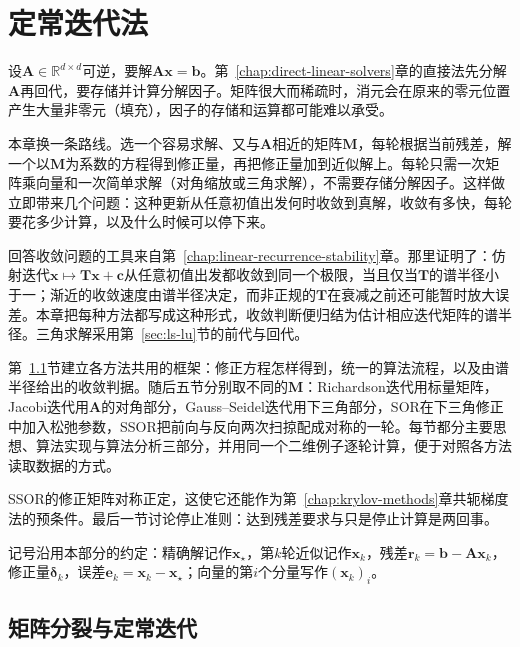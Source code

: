 \chapter{定常迭代法}
\label{sec:ls-stationary-iterations}
\label{chap:stationary-iterations}

设$\bm A\in\mathbb R^{d\times d}$可逆，要解$\bm A\bm x=\bm b$。第~\ref{chap:direct-linear-solvers}章的直接法先分解$\bm A$再回代，要存储并计算分解因子。矩阵很大而稀疏时，消元会在原来的零元位置产生大量非零元（填充），因子的存储和运算都可能难以承受。

本章换一条路线。选一个容易求解、又与$\bm A$相近的矩阵$\bm M$，每轮根据当前残差，解一个以$\bm M$为系数的方程得到修正量，再把修正量加到近似解上。每轮只需一次矩阵乘向量和一次简单求解（对角缩放或三角求解），不需要存储分解因子。这样做立即带来几个问题：这种更新从任意初值出发何时收敛到真解，收敛有多快，每轮要花多少计算，以及什么时候可以停下来。

回答收敛问题的工具来自第~\ref{chap:linear-recurrence-stability}章。那里证明了：仿射迭代$\bm x\mapsto\bm T\bm x+\bm c$从任意初值出发都收敛到同一个极限，当且仅当$\bm T$的谱半径小于一；渐近的收敛速度由谱半径决定，而非正规的$\bm T$在衰减之前还可能暂时放大误差。本章把每种方法都写成这种形式，收敛判断便归结为估计相应迭代矩阵的谱半径。三角求解采用第~\ref{sec:ls-lu}节的前代与回代。

第~\ref{sec:ls-matrix-splitting}节建立各方法共用的框架：修正方程怎样得到，统一的算法流程，以及由谱半径给出的收敛判据。随后五节分别取不同的$\bm M$：Richardson迭代用标量矩阵，Jacobi迭代用$\bm A$的对角部分，Gauss--Seidel迭代用下三角部分，SOR在下三角修正中加入松弛参数，SSOR把前向与反向两次扫掠配成对称的一轮。每节都分主要思想、算法实现与算法分析三部分，并用同一个二维例子逐轮计算，便于对照各方法读取数据的方式。

SSOR的修正矩阵对称正定，这使它还能作为第~\ref{chap:krylov-methods}章共轭梯度法的预条件。最后一节讨论停止准则：达到残差要求与只是停止计算是两回事。

记号沿用本部分的约定：精确解记作$\bm x_\star$，第$k$轮近似记作$\bm x_k$，残差$\bm r_k=\bm b-\bm A\bm x_k$，修正量$\bm\delta_k$，误差$\bm e_k=\bm x_k-\bm x_\star$；向量的第$i$个分量写作$(\bm x_k)_i$。

\section{矩阵分裂与定常迭代}
\label{sec:ls-matrix-splitting}

